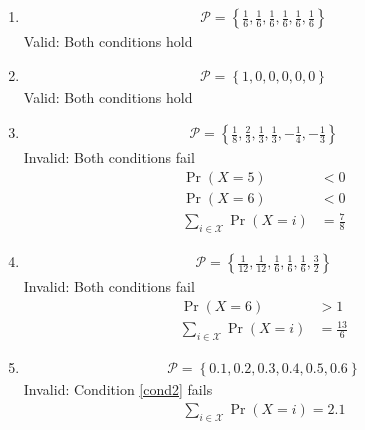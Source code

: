 \documentclass[journal,12pt,twocolumn]{IEEEtran}
\providecommand{\pr}[1]{\ensuremath{\Pr\left(#1\right)}}
\providecommand{\cbrak}[1]{\ensuremath{\left\{#1\right\}}}
\begin{document}
	\begin{enumerate}[label=(\alph*)]
	\item 
	\begin{align}
		\mathcal{P} = \cbrak{\frac16, \frac16, \frac16, \frac16, \frac16, \frac16}
	\end{align}
	Valid: Both conditions hold

	\item 
	\begin{align}
		\mathcal{P} = \cbrak{1, 0, 0, 0, 0, 0}
	\end{align}
	Valid: Both conditions hold
	
	\item 
	\begin{align}
		\mathcal{P} = \cbrak{\frac18, \frac23, \frac13, \frac13, -\frac14, -\frac13}
	\end{align}
	Invalid: Both conditions fail
	\begin{align}
		\pr{X=5} &< 0 \\
		\pr{X=6} &< 0 \\
		\sum_{i \in \mathcal{X}} \pr{X=i} &= \frac78
	\end{align}
	
	\item 
	\begin{align}
		\mathcal{P} = \cbrak{\frac{1}{12}, \frac{1}{12}, \frac16, \frac16, \frac16, \frac32}
	\end{align}
	Invalid: Both conditions fail	
	\begin{align}
		\pr{X=6} &> 1 \\
		\sum_{i \in \mathcal{X}} \pr{X=i} &= \frac{13}{6}
	\end{align}
	
	\item 
	\begin{align}
		\mathcal{P} = \cbrak{0.1, 0.2, 0.3, 0.4, 0.5, 0.6}
	\end{align}
	Invalid: Condition \eqref{cond2} fails
	\begin{align}
		\sum_{i \in \mathcal{X}} \pr{X=i} = 2.1
	\end{align}
	
	\end{enumerate}
	
\end{document}
